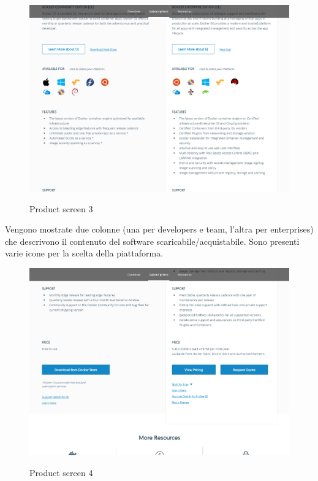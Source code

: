 \documentclass[a4paper]{article}
\begin{document}
\begin{figure}[H]
	\centering
	\includegraphics[width=\linewidth]{images/product3.png}
    \label{fig:product3}
    \caption{Product screen 3}
\end{figure}

\noindent Vengono mostrate due colonne (una per developers e team, l'altra per enterprises) che descrivono il contenuto del software scaricabile/acquistabile. Sono presenti varie icone per la scelta della piattaforma.

\begin{figure}[H]
	\centering
	\includegraphics[width=\linewidth]{images/product4.png}
    \label{fig:product4}
    \caption{Product screen 4}
\end{figure}
\end{document}
